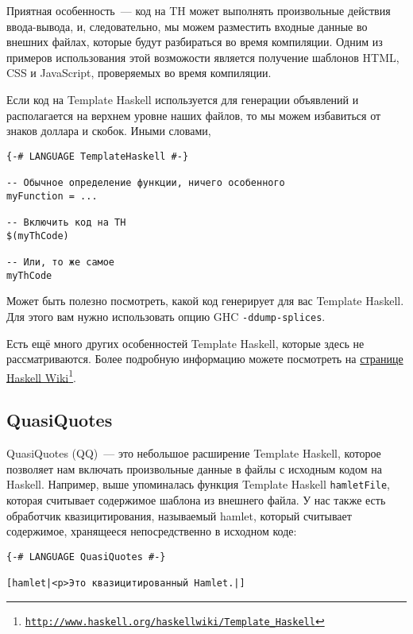 Приятная особенность~--- код на TH может выполнять произвольные действия ввода-вывода, и, следовательно, мы можем разместить входные данные во внешних файлах, которые будут разбираться во время компиляции. Одним из примеров использования этой возможости является получение шаблонов HTML, CSS и JavaScript, проверяемых во время компиляции.

Если код на Template Haskell используется для генерации объявлений и располагается на верхнем уровне наших файлов, то мы можем избавиться от знаков доллара и скобок. Иными словами,

\begin{lstlisting}
{-# LANGUAGE TemplateHaskell #-}

-- Обычное определение функции, ничего особенного
myFunction = ...

-- Включить код на TH
$(myThCode)

-- Или, то же самое
myThCode
\end{lstlisting}

Может быть полезно посмотреть, какой код генерирует для вас Template Haskell. Для этого вам нужно использовать опцию GHC \texttt{-ddump-splices}.

\begin{remark}
Есть ещё много других особенностей Template Haskell, которые здесь не рассматриваются. Более подробную информацию можете посмотреть на \href{http://www.haskell.org/haskellwiki/Template\_Haskell}{странице Haskell Wiki}\footnote{\href{http://www.haskell.org/haskellwiki/Template\_Haskell}{\texttt{http://www.haskell.org/haskellwiki/Template\_Haskell}}}.
\end{remark}

\subsection{QuasiQuotes}

QuasiQuotes (QQ)~--- это небольшое расширение Template Haskell, которое позволяет нам включать произвольные данные в файлы с исходным кодом на Haskell. Например, выше упоминалась функция Template Haskell \lstinline'hamletFile', которая считывает содержимое шаблона из внешнего файла. У нас также есть обработчик квазицитирования, называемый hamlet, который считывает содержимое, хранящееся непосредственно в исходном коде:

\begin{lstlisting}
{-# LANGUAGE QuasiQuotes #-}

[hamlet|<p>Это квазицитированный Hamlet.|]
\end{lstlisting}

